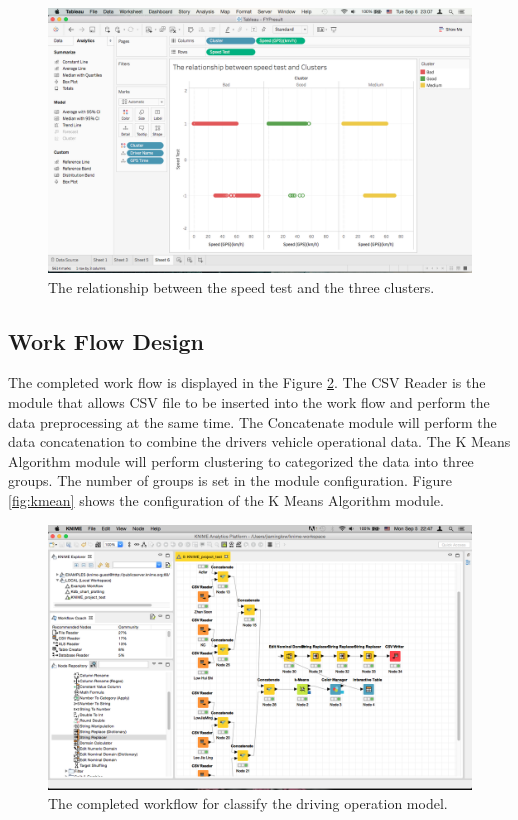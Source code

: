\begin{figure}[hbt!]\centering
\includegraphics[height=.5\textwidth]{image/clusterresult}
\caption{The relationship between the speed test and the three clusters.}
\label{fig:cluster_result}
\end{figure}


\subsection{Work Flow Design}
The completed work flow is displayed in the Figure \ref{fig:workflow}. The CSV Reader is the module that allows CSV file to be inserted into the work flow and perform the data preprocessing at the same time. The Concatenate module will perform the data concatenation to combine the drivers vehicle operational data. The K Means Algorithm module will perform clustering to categorized the data into three groups. The number of groups is set in the module configuration. Figure \ref{fig:kmean} shows the configuration of the K Means Algorithm module.

\begin{figure}[hbt!]\centering
\includegraphics[width=.75\textwidth]{image/KNIMEfile}
\caption{The completed workflow for classify the driving operation model.}
\label{fig:workflow}
\end{figure}

